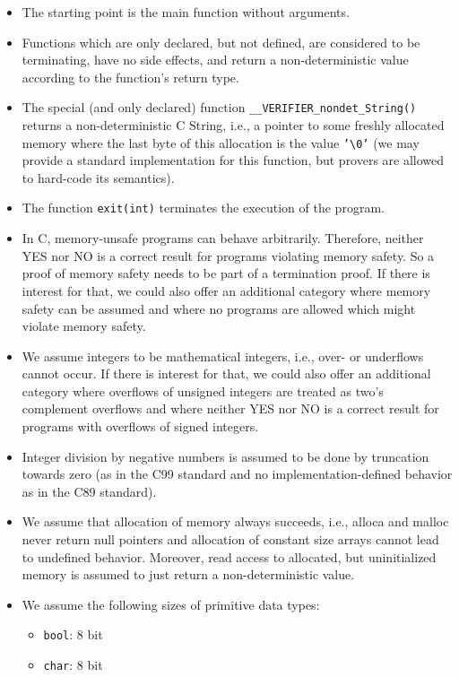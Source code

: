 \begin{itemize}
\item The starting point is the main function without arguments.
%
\item Functions which are only declared, but not defined, are considered to be terminating, have no side effects, and return a non-deterministic value according to the function's return type.
%
\item The special (and only declared) function \texttt{\_\_VERIFIER\_nondet\_String()} returns a non-deterministic C String, i.e., a pointer to some freshly allocated memory where the last byte of this allocation is the value \texttt{'\textbackslash 0'} (we may provide a standard implementation for this function, but provers are allowed to hard-code its semantics).
%
\item The function \texttt{exit(int)} terminates the execution of the program.
%
\item In C, memory-unsafe programs can behave arbitrarily.
  Therefore, neither YES nor NO is a correct result for programs violating memory safety.
  So a proof of memory safety needs to be part of a termination proof.
  If there is interest for that, we could also offer an additional category where memory safety can be assumed and where no programs are allowed which might violate memory safety.
\item We assume integers to be mathematical integers, i.e., over- or underflows cannot occur.
  If there is interest for that, we could also offer an additional category where overflows of unsigned integers are treated as two's complement overflows and where neither YES nor NO is a correct result for programs with overflows of signed integers.
%
\item Integer division by negative numbers is assumed to be done by truncation towards zero (as in the C99 standard and no implementation-defined behavior as in the C89 standard).
\item We assume that allocation of memory always succeeds, i.e., alloca and malloc never return null pointers and allocation of constant size arrays cannot lead to undefined behavior. Moreover, read access to allocated, but uninitialized memory is assumed to just return a non-deterministic value.
\item We assume the following sizes of primitive data types:
  \begin{itemize}
  \item \texttt{bool}: 8 bit
  \item \texttt{char}: 8 bit

\end{itemize}
\end{itemize}
